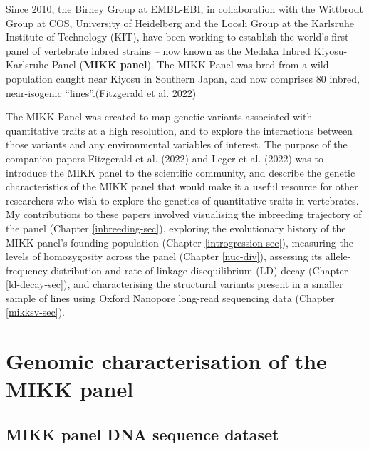 \documentclass[
]{book}
\begin{document}
Since 2010, the Birney Group at EMBL-EBI, in collaboration with the Wittbrodt Group at COS, University of Heidelberg and the Loosli Group at the Karlsruhe Institute of Technology (KIT), have been working to establish the world's first panel of vertebrate inbred strains -- now known as the Medaka Inbred Kiyosu-Karlsruhe Panel (\textbf{MIKK panel}). The MIKK Panel was bred from a wild population caught near Kiyosu in Southern Japan, and now comprises 80 inbred, near-isogenic ``lines''.(Fitzgerald et al. 2022)

The MIKK Panel was created to map genetic variants associated with quantitative traits at a high resolution, and to explore the interactions between those variants and any environmental variables of interest. The purpose of the companion papers Fitzgerald et al. (2022) and Leger et al. (2022) was to introduce the MIKK panel to the scientific community, and describe the genetic characteristics of the MIKK panel that would make it a useful resource for other researchers who wish to explore the genetics of quantitative traits in vertebrates. My contributions to these papers involved visualising the inbreeding trajectory of the panel (Chapter \ref{inbreeding-sec}),
exploring the evolutionary history of the MIKK panel's founding population (Chapter \ref{introgression-sec}), measuring the levels of homozygosity across the panel (Chapter \ref{nuc-div}), assessing its allele-frequency distribution and rate of linkage disequilibrium (LD) decay (Chapter \ref{ld-decay-sec}), and characterising the structural variants present in a smaller sample of lines using Oxford Nanopore long-read sequencing data (Chapter \ref{mikksv-sec}).

\hypertarget{genomic-characterisation-of-the-mikk-panel}{%
\section{Genomic characterisation of the MIKK panel}\label{genomic-characterisation-of-the-mikk-panel}}

\hypertarget{non-sib-calls}{%
\subsection{MIKK panel DNA sequence dataset}\label{non-sib-calls}}
\end{document}
